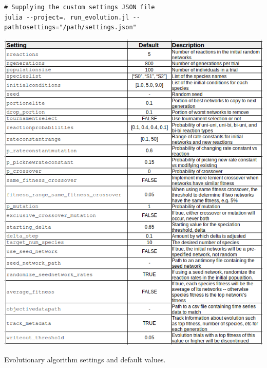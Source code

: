 \documentclass[12pt]{report}
\begin{document}
\begin{appendices}
\begin{Verbatim}[frame=single]
# Supplying the custom settings JSON file
julia --project=. run_evolution.jl --pathtosettings="/path/settings.json"
\end{Verbatim}


\begin{table}

    \includegraphics[width=18cm]{images/hyperparams.png}
    \caption[Evolution algorithm settings]{Evolutionary algorithm settings and default values.}
    \label{table:hyperparams}
\end{table}


\end{appendices}	



\end{document}
